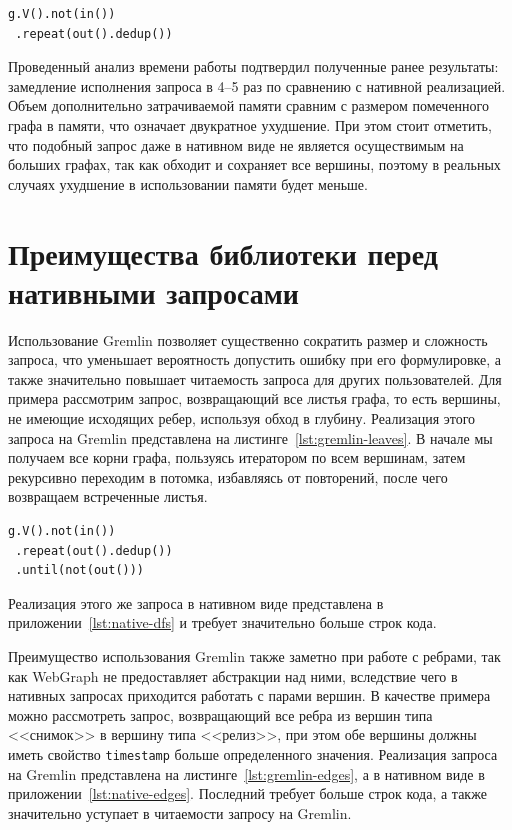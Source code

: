 \documentclass[times,specification,annotation]{itmo-student-thesis}
\begin{document}
\begin{lstlisting}[float=!h,caption={Запрос, обходящий весь граф},label={lst:gremlin-dfs}]
g.V().not(in())
 .repeat(out().dedup())
\end{lstlisting}

Проведенный анализ времени работы подтвердил полученные ранее результаты: замедление исполнения запроса в 4--5 раз по сравнению с нативной реализацией. Объем дополнительно затрачиваемой памяти сравним с размером помеченного графа в памяти, что означает двукратное ухудшение. При этом стоит отметить, что подобный запрос даже в нативном виде не является осуществимым на больших графах, так как обходит и сохраняет все вершины, поэтому в реальных случаях ухудшение в использовании памяти будет меньше.

\section{Преимущества библиотеки перед нативными запросами}

Использование Gremlin позволяет существенно сократить размер и сложность запроса, что уменьшает вероятность допустить ошибку при его формулировке, а также значительно повышает читаемость запроса для других пользователей. Для примера рассмотрим запрос, возвращающий все листья графа, то есть вершины, не имеющие исходящих ребер, используя обход в глубину. Реализация этого запроса на Gremlin представлена на листинге~\ref{lst:gremlin-leaves}. В начале мы получаем все корни графа, пользуясь итератором по всем вершинам, затем рекурсивно переходим в потомка, избавляясь от повторений, после чего возвращаем встреченные листья.

\begin{lstlisting}[float=!h,caption={Получение листьев графа на Gremlin},label={lst:gremlin-leaves}]
g.V().not(in())
 .repeat(out().dedup())
 .until(not(out()))
\end{lstlisting}

Реализация этого же запроса в нативном виде представлена в приложении~\ref{lst:native-dfs} и требует значительно больше строк кода.

Преимущество использования Gremlin также заметно при работе с ребрами, так как WebGraph не предоставляет абстракции над ними, вследствие чего в нативных запросах приходится работать с парами вершин. В качестве примера можно рассмотреть запрос, возвращающий все ребра из вершин типа <<снимок>> в вершину типа <<релиз>>, при этом обе вершины должны иметь свойство \texttt{timestamp} больше определенного значения. Реализация запроса на Gremlin представлена на листинге~\ref{lst:gremlin-edges}, а в нативном виде в приложении~\ref{lst:native-edges}. Последний требует больше строк кода, а также значительно уступает в читаемости запросу на Gremlin.
\end{document}
